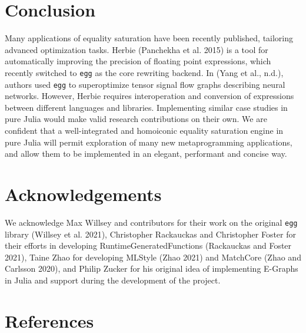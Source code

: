 \documentclass[
]{article}
\begin{document}
\hypertarget{conclusion}{%
\section{Conclusion}\label{conclusion}}

Many applications of equality saturation have been recently published,
tailoring advanced optimization tasks. Herbie (Panchekha et al. 2015) is
a tool for automatically improving the precision of floating point
expressions, which recently switched to \texttt{egg} as the core
rewriting backend. In (Yang et al., n.d.), authors used \texttt{egg} to
superoptimize tensor signal flow graphs describing neural networks.
However, Herbie requires interoperation and conversion of expressions
between different languages and libraries. Implementing similar case
studies in pure Julia would make valid research contributions on their
own. We are confident that a well-integrated and homoiconic equality
saturation engine in pure Julia will permit exploration of many new
metaprogramming applications, and allow them to be implemented in an
elegant, performant and concise way.

\hypertarget{acknowledgements}{%
\section{Acknowledgements}\label{acknowledgements}}

We acknowledge Max Willsey and contributors for their work on the
original \texttt{egg} library (Willsey et al. 2021), Christopher
Rackauckas and Christopher Foster for their efforts in developing
RuntimeGeneratedFunctions (Rackauckas and Foster 2021), Taine Zhao for
developing MLStyle (Zhao 2021) and MatchCore (Zhao and Carlsson 2020),
and Philip Zucker for his original idea of implementing E-Graphs in
Julia and support during the development of the project.

\hypertarget{references}{%
\section*{References}\label{references}}
\end{document}
